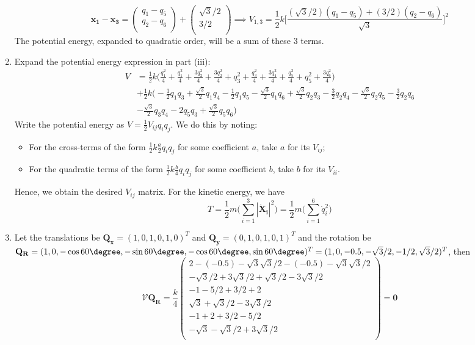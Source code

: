 \documentclass[a4paper]{article}
\begin{document}
\begin{ans}
\begin{enumerate}[label=(\roman*)]
$$\mathbf{x_1}-\mathbf{x_3}=\begin{pmatrix}q_1-q_5\\q_2-q_6\\\end{pmatrix}+\begin{pmatrix}\sqrt{3}/2\\3/2\\\end{pmatrix}\implies V_{1,3}=\frac{1}{2}k\bigg[\frac{(\sqrt{3}/2)(q_1-q_5)+(3/2)(q_2-q_6)}{\sqrt{3}}\bigg]^2$$
The potential energy, expanded to quadratic order, will be a sum of these 3 terms.
\item Expand the potential energy expression in part (iii):
\begin{align}
    V&=\frac{1}{2}k\bigg(\frac{q_1^2}{4}+\frac{q_1^2}{4}+\frac{3q_2^2}{4}+\frac{3q_2^2}{4}+q_3^2+\frac{q_3^2}{4}+\frac{3q_4^2}{4}+\frac{q_5^2}{4}+q_5^2+\frac{3q_6^2}{4}\bigg)\nonumber\\&+\frac{1}{2}k\bigg(-\frac{1}{2}q_1q_3+\frac{\sqrt{3}}{2}q_1q_4-\frac{1}{2}q_1q_5-\frac{\sqrt{3}}{2}q_1q_6+\frac{\sqrt{3}}{2}q_2q_3-\frac{3}{2}q_2q_4-\frac{\sqrt{3}}{2}q_2q_5-\frac{3}{2}q_2q_6\nonumber\\&-\frac{\sqrt{3}}{2}q_3q_4-2q_5q_3+\frac{\sqrt{3}}{2}q_5q_6\bigg)\nonumber
\end{align}
Write the potential energy as $V=\frac{1}{2}V_{ij}q_iq_j$. We do this by noting:
\begin{itemize}
    \item For the cross-terms of the form $\frac{1}{2}k\frac{a}{2}q_iq_j$ for some coefficient $a$, take $a$ for its $V_{ij}$;
    \item For the quadratic terms of the form $\frac{1}{2}k\frac{b}{4}q_iq_j$ for some coefficient $b$, take $b$ for its $V_{ii}$.
\end{itemize}
 Hence, we obtain the desired $V_{ij}$ matrix. For the kinetic energy, we have
 $$T=\frac{1}{2}m\bigg(\sum_{i=1}^3|\mathbf{\dot{X}_i}|^2\bigg)=\frac{1}{2}m\bigg(\sum_{i=1}^6\dot{q}_i^2\bigg)$$
 \item Let the translations be $\mathbf{Q_x}=(1,0,1,0,1,0)^T$ and $\mathbf{Q_y}=(0,1,0,1,0,1)^T$ and the rotation be $\mathbf{Q_R}=(1,0,-\cos60\degree,-\sin60\degree,-\cos60\degree,\sin60\degree)^T=(1,0,-0.5,-\sqrt{3}/2,-1/2,\sqrt{3}/2)^T$, then
 $$\mathcal{V}\mathbf{Q_R}=\frac{k}{4}\begin{pmatrix}2-(-0.5)-\sqrt{3}\sqrt{3}/2-(-0.5)-\sqrt{3}\sqrt{3}/2\\-\sqrt{3}/2+3\sqrt{3}/2+\sqrt{3}/2-3\sqrt{3}/2\\-1-5/2+3/2+2\\\sqrt{3}+\sqrt{3}/2-3\sqrt{3}/2\\-1+2+3/2-5/2\\-\sqrt{3}-\sqrt{3}/2+3\sqrt{3}/2\\\end{pmatrix}=\boldsymbol{0}$$

\end{enumerate}
\end{ans}
\end{document}

